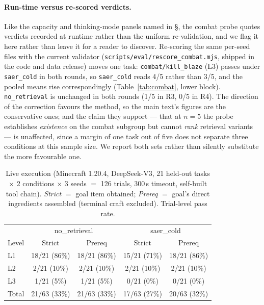 \documentclass[letterpaper]{article} %
\newcommand{\bodyref}[1]{\getrefnumber{#1}}
\begin{document}
\paragraph{Run-time versus re-scored verdicts.}  Like the capacity and
thinking-mode panels named in \S\bodyref{sec:protocol}, the combat probe
quotes verdicts recorded at runtime rather than the uniform
re-validation, and we flag it here
rather than leave it for a reader to discover.  Re-scoring the same
per-seed files with the current validator
(\texttt{scripts/\allowbreak eval/\allowbreak rescore\_combat.mjs}, shipped in the code and data
release) moves one task: \texttt{combat/kill\_blaze} (L3) passes under
\texttt{saer\_cold} in both rounds, so \texttt{saer\_cold} reads 4/5
rather than 3/5, and the pooled means rise correspondingly
(Table~\ref{tab:combat}, lower block).  \texttt{no\_retrieval} is
unchanged in both rounds (1/5 in R3, 0/5 in R4).  The direction of the
correction favours the method, so the main text's figures are the
conservative ones; and the claim they support --- that at $n{=}5$ the
probe establishes \emph{existence} on the combat subgroup but cannot \emph{rank}
retrieval variants --- is unaffected, since a margin of one task out of
five does not separate three conditions at this sample size.  We report
both sets rather than silently substitute the more favourable one.

\begin{table}[tbp]
\centering
\caption{Live execution (Minecraft 1.20.4, DeepSeek-V3, 21 held-out tasks
$\times$ 2 conditions $\times$ 3 seeds $=$ 126 trials, 300\,s timeout,
self-built tool chain). \emph{Strict} $=$ goal item obtained;
\emph{Prereq} $=$ goal's direct ingredients assembled (terminal craft
excluded). Trial-level pass rate.}
\label{tab:live}
\small
\begin{tabular}{lcccc}
\toprule
 & \multicolumn{2}{c}{no\_retrieval} & \multicolumn{2}{c}{saer\_cold} \\
Level & Strict & Prereq & Strict & Prereq \\
\midrule
L1    & 18/21 (86\%) & 18/21 (86\%) & 15/21 (71\%) & 18/21 (86\%) \\
L2    & 2/21 (10\%)  & 2/21 (10\%)  & 2/21 (10\%)  & 2/21 (10\%) \\
L3    & 1/21 (5\%)   & 1/21 (5\%)   & 0/21 (0\%)   & 0/21 (0\%) \\
\midrule
Total & 21/63 (33\%) & 21/63 (33\%) & 17/63 (27\%) & 20/63 (32\%) \\
\bottomrule
\end{tabular}
\end{table}
\end{document}
